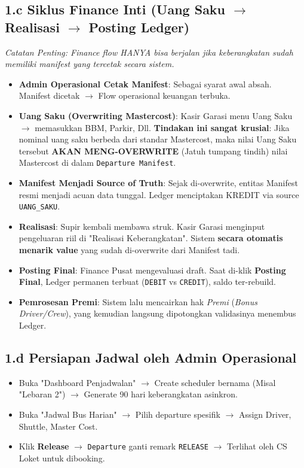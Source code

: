 \documentclass[11pt,a4paper]{article}
\begin{document}
\subsection{1.c Siklus Finance Inti (Uang Saku $\rightarrow$ Realisasi $\rightarrow$ Posting Ledger)}
\textit{Catatan Penting: Finance flow HANYA bisa berjalan jika keberangkatan sudah memiliki manifest yang tercetak secara sistem.}
\begin{itemize}
    \item \textbf{Admin Operasional Cetak Manifest}: Sebagai syarat awal absah. Manifest dicetak $\rightarrow$ Flow operasional keuangan terbuka.
    \item \textbf{Uang Saku (Overwriting Mastercost)}: Kasir Garasi menu Uang Saku $\rightarrow$ memasukkan BBM, Parkir, Dll. \textbf{Tindakan ini sangat krusial}: Jika nominal uang saku berbeda dari standar Mastercost, maka nilai Uang Saku tersebut \textbf{AKAN MENG-OVERWRITE} (Jatuh tumpang tindih) nilai Mastercost di dalam \texttt{Departure Manifest}.
    \item \textbf{Manifest Menjadi Source of Truth}: Sejak di-overwrite, entitas Manifest resmi menjadi acuan data tunggal. Ledger menciptakan KREDIT via source \texttt{UANG\_SAKU}.
    \item \textbf{Realisasi}: Supir kembali membawa struk. Kasir Garasi menginput pengeluaran riil di "Realisasi Keberangkatan". Sistem \textbf{secara otomatis menarik value} yang sudah di-overwrite dari Manifest tadi.
    \item \textbf{Posting Final}: Finance Pusat mengevaluasi draft. Saat di-klik \textbf{Posting Final}, Ledger permanen terbuat (\texttt{DEBIT} vs \texttt{CREDIT}), saldo ter-rebuild.
    \item \textbf{Pemrosesan Premi}: Sistem lalu mencairkan hak \textit{Premi} (\textit{Bonus Driver/Crew}), yang kemudian langsung dipotongkan validasinya menembus Ledger.
\end{itemize}

\subsection{1.d Persiapan Jadwal oleh Admin Operasional}
\begin{itemize}
    \item Buka "Dashboard Penjadwalan" $\rightarrow$ Create scheduler bernama (Misal "Lebaran 2") $\rightarrow$ Generate 90 hari keberangkatan asinkron.
    \item Buka "Jadwal Bus Harian" $\rightarrow$ Pilih departure spesifik $\rightarrow$ Assign Driver, Shuttle, Master Cost.
    \item Klik \textbf{Release} $\rightarrow$ \texttt{Departure} ganti remark \texttt{RELEASE} $\rightarrow$ Terlihat oleh CS Loket untuk dibooking.
\end{itemize}
\end{document}
